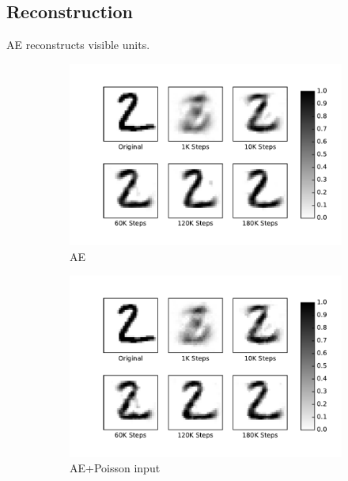 \subsection{Reconstruction}
AE reconstructs visible units.
\begin{figure}
	\centering
	\begin{subfigure}[t]{0.32\textwidth}
		\includegraphics[width=\textwidth]{pics_sdlm/22_MNIST_AE/recon_digit.pdf}
		\caption{AE}
	\end{subfigure}
	\begin{subfigure}[t]{0.32\textwidth}
		\includegraphics[width=\textwidth]{pics_sdlm/23_MNIST_AE_noise/recon_digit.pdf}
		\caption{AE+Poisson input}
	\end{subfigure}
	\begin{subfigure}[t]{0.32\textwidth}

\end{subfigure}
\end{figure}
